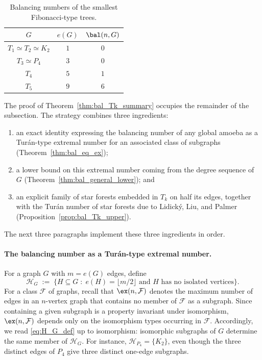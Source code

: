 \begin{table}[ht]
    \centering
    \begin{tabular}{c|c|c}
        $G$ & $e(G)$ & $\bal(n,G)$ \\\hline
        $T_1\simeq T_2\simeq K_2$ & $1$ & $0$ \\
        $T_3\simeq P_4$ & $3$ & $0$ \\
        $T_4$ & $5$ & $1$ \\
        $T_5$ & $9$ & $6$
    \end{tabular}
    \caption{Balancing numbers of the smallest Fibonacci-type trees.}
    \label{tbl:small_bal_Tk}
\end{table}

The proof of Theorem~\ref{thm:bal_Tk_summary} occupies the remainder of the subsection.
The strategy combines three ingredients:
\begin{enumerate}
    \item an exact identity expressing the balancing number of any global amoeba as a Tur\'an-type extremal number for an associated class of subgraphs (Theorem~\ref{thm:bal_eq_ex});
    \item a lower bound on this extremal number coming from the degree sequence of $G$ (Theorem~\ref{thm:bal_general_lower}); and
    \item an explicit family of star forests embedded in $T_k$ on half its edges, together with the Tur\'an number of star forests due to Lidick\'y, Liu, and Palmer (Proposition~\ref{prop:bal_Tk_upper}).
\end{enumerate}

The next three paragraphs implement these three ingredients in order.

\paragraph{The balancing number as a Tur\'an-type extremal number.}

For a graph $G$ with $m=e(G)$ edges, define
\begin{equation}\label{eq:H_G_def}
    \mathcal H_G \;:=\; \bigl\{H\subseteq G \;:\; e(H)=\lfloor m/2\rfloor \text{ and } H\text{ has no isolated vertices}\bigr\}.
\end{equation}
For a class $\mathcal F$ of graphs, recall that $\ex(n,\mathcal F)$ denotes the maximum number of edges in an $n$-vertex graph that contains no member of $\mathcal F$ as a subgraph.
Since containing a given subgraph is a property invariant under isomorphism, $\ex(n,\mathcal F)$ depends only on the isomorphism types occurring in $\mathcal F$.
Accordingly, we read \eqref{eq:H_G_def} up to isomorphism: isomorphic subgraphs of $G$ determine the same member of $\mathcal H_G$.
For instance, $\mathcal H_{P_4}=\{K_2\}$, even though the three distinct edges of $P_4$ give three distinct one-edge subgraphs.

